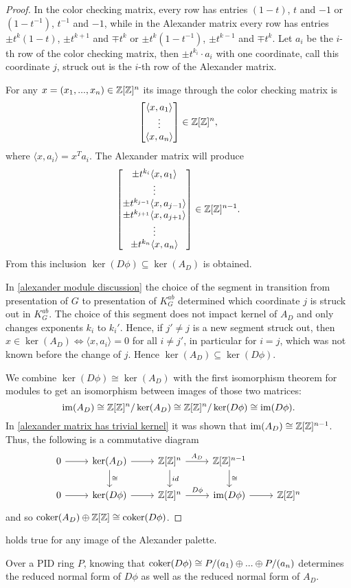 \begin{proof}
  In the color checking matrix, every row has entries $(1-t)$, $t$ and $-1$ or $(1-t^{-1})$, $t^{-1}$ and $-1$, while in the Alexander matrix every row has entries $\pm t^k(1-t)$, $\pm t^{k+1}$ and $\mp t^k$ or $\pm t^k(1-t^{-1})$, $\pm t^{k-1}$ and $\mp t^k$. Let $a_i$ be the $i$-th row of the color checking matrix, then $\pm t^{k_i}\cdot a_i$ with one coordinate, call this coordinate $j$, struck out is the $i$-th row of the Alexander matrix.

  For any $x=(x_1,..., x_n)\in\operatorname{\mathbb{Z}}[\operatorname{\mathbb{Z}}]^n$ its image through the color checking matrix is 
  $$\begin{bmatrix} 
    \langle x, a_1\rangle\\ 
    \vdots\\ 
    \langle x, a_n\rangle 
  \end{bmatrix} \in\operatorname{\mathbb{Z}}[\operatorname{\mathbb{Z}}]^n,$$
  where $\langle x, a_i\rangle=x^Ta_i$. The Alexander matrix will produce
  $$\begin{bmatrix} 
    \pm t^{k_i} \langle x, a_1\rangle\\ 
    \vdots\\ 
    \pm t^{k_{j-1}} \langle x, a_{j-1}\rangle \\ 
    \pm t^{k_{j+1}} \langle x, a_{j+1}\rangle \\ 
    \vdots \\ 
  \pm t^{k_n}\langle x, a_n\rangle\end{bmatrix}\in\operatorname{\mathbb{Z}}[\operatorname{\mathbb{Z}}]^{n-1}.$$
  From this inclusion $\ker(D\phi)\subseteq \ker(A_D)$ is obtained.

  In \cref{alexander module discussion} the choice of the segment in transition from presentation of $G$ to presentation of $K_G^{ab}$ determined which coordinate $j$ is struck out in $K_G^{ab}$. The choice of this segment does not impact kernel of $A_D$ and only changes exponents $k_i$ to $k_i'$. Hence, if $j'\neq j$ is a new segment struck out, then $x\in \ker(A_D)\iff \langle x, a_i\rangle=0$ for all $i\neq j'$, in particular for $i=j$, which was not known before the change of $j$. 
  Hence $\ker(A_D)\subseteq \ker(D\phi)$. 

We combine $\ker(D\phi)\cong \ker(A_D)$ with the first isomorphism theorem for modules to get an isomorphism between images of those two matrices:
$$\operatorname{im}(A_D)\cong \operatorname{\mathbb{Z}}[\operatorname{\mathbb{Z}}]^n/\ker(A_D)\cong \operatorname{\mathbb{Z}}[\operatorname{\mathbb{Z}}]^n/\ker(D\phi)\cong \operatorname{im}(D\phi).$$
In \cref{alexander matrix has trivial kernel} it was shown that $\operatorname{im}(A_D)\cong \operatorname{\mathbb{Z}}[\operatorname{\mathbb{Z}}]^{n-1}$. Thus, the following is a commutative diagram
$$
\begin{tikzcd}
  0\arrow[r] & \ker(A_D)\arrow[r] \arrow[d, "\cong"] & \Z[\Z]^n\arrow[r, "A_D"] \arrow[d, "id"] & \Z[\Z]^{n-1}\arrow[d, "\cong"] \\ 
  0\arrow[r] & \ker(D\phi)\arrow[r] & \Z[\Z]^n\arrow[r, "D\phi"] & \im(D\phi) \arrow[r] & \Z[\Z]^n
\end{tikzcd}
$$
and so $\operatorname{coker}(A_D)\oplus \operatorname{\mathbb{Z}}[\operatorname{\mathbb{Z}}]\cong \operatorname{coker}(D\phi)$.
\end{proof}

 holds true for any image of the Alexander palette. 

Over a PID ring $P$, knowing that $\operatorname{coker}(D\phi)\cong P/(a_1)\oplus ...\oplus P/(a_n)$ determines the reduced normal form of $D\phi$ as well as the reduced normal form of $A_D$. 
